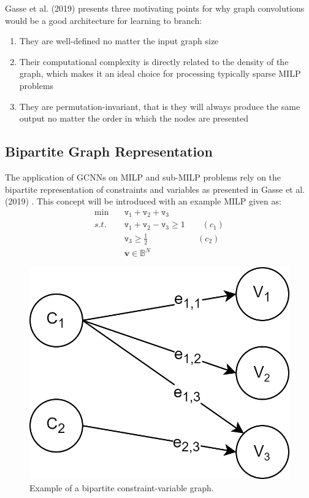 Gasse et al. (2019) \cite{gasse2019exact} presents three motivating points for why graph convolutions would be a good architecture for learning to branch:
\begin{enumerate}[label=(\roman*)]
    \item They are well-defined no matter the input graph size
    \item Their computational complexity is directly related
to the density of the graph, which makes it an ideal choice for processing typically sparse \gls{MILP}
problems
    \item They are permutation-invariant, that is they will always produce the same output no
matter the order in which the nodes are presented
\end{enumerate}




\subsection{Bipartite Graph Representation}

The application of \gls{GCNN}s on \gls{MILP} and sub-\gls{MILP} problems rely on the bipartite representation of constraints and variables as presented in Gasse et al. (2019) \cite{gasse2019exact}.
This concept will be introduced with an example \gls{MILP} given as:
\begin{align}\label{eq:bipex}
    \min \quad &\texttt{v}_1 + \texttt{v}_2 + \texttt{v}_3\\ 
    s.t. \quad &\texttt{v}_1 + \texttt{v}_2 - \texttt{v}_3 \geq 1 \qquad (c_1)\nonumber\\
    &\texttt{v}_3 \geq \frac{1}{2}\qquad\qquad\quad\;\,\,\, (c_2)\nonumber\\
    &\mathbf{v} \in \mathbb{B}^N \nonumber
\end{align}

\begin{figure}
    \centering
    \includegraphics[width=0.45\linewidth]{img/bipartite_zoom.png}
    \caption{Example of a bipartite constraint-variable graph.}
    \label{fig:bipartite_cv}
\end{figure}

